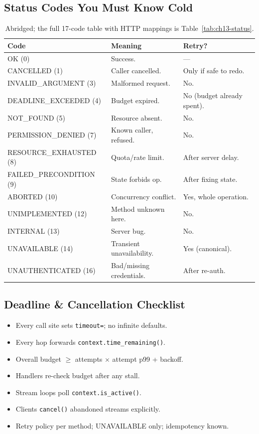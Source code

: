 \subsection*{Status Codes You Must Know Cold}
\begin{table}[h]
  \centering
  \small
  \begin{tabularx}{\textwidth}{l X l}
    \toprule
    \textbf{Code} & \textbf{Meaning} & \textbf{Retry?} \\
    \midrule
    OK (0) & Success. & --- \\
    CANCELLED (1) & Caller cancelled. & Only if safe to redo. \\
    INVALID\_ARGUMENT (3) & Malformed request. & No. \\
    DEADLINE\_EXCEEDED (4) & Budget expired. & No (budget already spent). \\
    NOT\_FOUND (5) & Resource absent. & No. \\
    PERMISSION\_DENIED (7) & Known caller, refused. & No. \\
    RESOURCE\_EXHAUSTED (8) & Quota/rate limit. & After server delay. \\
    FAILED\_PRECONDITION (9) & State forbids op. & After fixing state. \\
    ABORTED (10) & Concurrency conflict. & Yes, whole operation. \\
    UNIMPLEMENTED (12) & Method unknown here. & No. \\
    INTERNAL (13) & Server bug. & No. \\
    UNAVAILABLE (14) & Transient unavailability. & Yes (canonical). \\
    UNAUTHENTICATED (16) & Bad/missing credentials. & After re-auth. \\
    \bottomrule
  \end{tabularx}
  \caption{Abridged; the full 17-code table with HTTP mappings is
  Table~\ref{tab:ch13-status}.}
\end{table}

\subsection*{Deadline \& Cancellation Checklist}
\begin{itemize}
  \item[$\square$] Every call site sets \texttt{timeout=}; no infinite defaults.
  \item[$\square$] Every hop forwards \texttt{context.time\_remaining()}.
  \item[$\square$] Overall budget $\geq$ attempts $\times$ attempt p99 + backoff.
  \item[$\square$] Handlers re-check budget after any stall.
  \item[$\square$] Stream loops poll \texttt{context.is\_active()}.
  \item[$\square$] Clients \texttt{cancel()} abandoned streams explicitly.
  \item[$\square$] Retry policy per method; UNAVAILABLE only; idempotency known.
\end{itemize}

